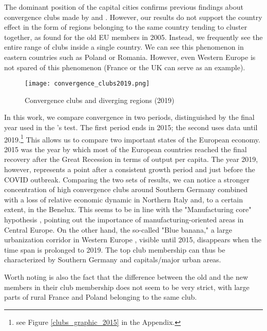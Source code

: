 \documentclass[11pt]{article}
\begin{document}
The dominant position of the capital cities confirms previous findings about convergence clubs made by \citet{sme2012regional} and \citet{bartkowska2012regional}. However, our results do not support the country effect in the form of regions belonging to the same country tending to cluster together, as \citet{bartkowska2012regional} found for the old EU members in 2005. Instead, we frequently see the entire range of clubs inside a single country. We can see this phenomenon in eastern countries such as Poland or Romania. However,
even Western Europe is not spared of this phenomenon (France or the UK can serve as an example).


\begin{figure}%
\centering 
  {\texttt{[image: convergence\_clubs2019.png]} }
  \caption{Convergence clubs and diverging regions (2019)}
\label{clubs_graphic}
\end{figure} 


In this work, we compare convergence in two periods, distinguished by the final year used in the \citeauthor{phillips2007transition}'s test. The first period ends in 2015; the second uses data until 2019.\footnote{see Figure \ref{clubs_graphic_2015} in the Appendix.} This allows us to compare two important states of the European economy. 2015 was the year by which most of the European countries reached the final recovery after the Great Recession in terms of output per capita. The year 2019, however, represents a point after a consistent growth period and just before the COVID outbreak.
Comparing the two sets of results, we can notice a stronger concentration of high convergence clubs around Southern Germany combined with a loss of relative economic dynamic in Northern Italy and, to a certain extent, in the Benelux. This seems to be in line with the "Manufacturing core" hypothesis \citep{cutrini2019economic, stollinger2016structural}, pointing out the importance of manufacturing-oriented areas in Central Europe. On the other hand, the so-called "Blue banana," a large urbanization corridor in Western Europe \citep{hospers2002beyond}, visible until 2015, disappears when the time span is prolonged to 2019. The top club membership can thus be characterized by Southern Germany and capitals/major urban areas.

Worth noting is also the fact that the difference between the old and the new members in their club membership does not seem to be very strict, with large parts of rural France and Poland belonging to the same club. 
\end{document}
